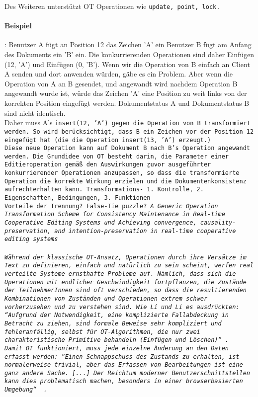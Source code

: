 Des Weiteren unterstützt \gls{OT} Operationen wie \tt{update}, \tt{point}, \tt{lock}.
\paragraph{Beispiel}:
Benutzer A fügt an Position 12 das Zeichen 'A' ein
Benutzer B fügt am Anfang des Dokuments ein 'B' ein.
Die konkurrierenden Operationen sind daher Einfügen (12, 'A') und Einfügen (0, 'B').
Wenn wir die Operation von B einfach an Client A senden und dort anwenden würden, gäbe es ein Problem.
Aber wenn die Operation von A an B gesendet, und angewandt wird nachdem Operation B angewandt wurde ist, würde das Zeichen 'A' eine Position zu weit links von der korrekten Position eingefügt werden.
Dokumentstatus A und Dokumentstatus B sind nicht identisch.\\
Daher muss A's \tt{insert(12, 'A')} gegen die Operation von B transformiert werden. So wird berücksichtigt, dass B ein Zeichen vor der Position 12 eingefügt hat (die die Operation \tt{insert(13, 'A')} erzeugt.)\\
Diese neue Operation kann auf Dokument B nach B's Operation angewandt werden.
Die Grundidee von \gls{OT} besteht darin, die Parameter einer Editieroperation gemäß den Auswirkungen \b{zuvor ausgeführter} konkurrierender Operationen anzupassen, so dass die transformierte Operation die korrekte Wirkung erzielen und die Dokumentenkonsistenz aufrechterhalten kann.
Transformations- 1. Kontrolle, 2. Eigenschaften, Bedingungen, 3. Funktionen\\
Vorteile der Trennung?
False-Tie puzzle? \it{A Generic Operation Transformation Scheme for Consistency Maintenance in Real-time Cooperative Editing Systems} und \it{Achieving convergence, causality-preservation, and intention-preservation in real-time cooperative editing systems}\\\\
Während der klassische OT-Ansatz, Operationen durch ihre Versätze im Text zu definieren, einfach und natürlich zu sein scheint, werfen real verteilte Systeme ernsthafte Probleme auf. Nämlich, dass sich die Operationen mit endlicher Geschwindigkeit fortpflanzen, die Zustände der TeilnehmerInnen sind oft verschieden, so dass die resultierenden Kombinationen von Zuständen und Operationen extrem schwer vorherzusehen und zu verstehen sind.
Wie Li und Li es ausdrückten: ``Aufgrund der Notwendigkeit, eine komplizierte Fallabdeckung in Betracht zu ziehen, sind formale Beweise sehr kompliziert und fehleranfällig, selbst für OT-Algorithmen, die nur zwei charakteristische Primitive behandeln (Einfügen und Löschen)``~\cite{ot-critic}.\\
Damit OT funktioniert, muss jede einzelne Änderung an den Daten erfasst werden: ``Einen Schnappschuss des Zustands zu erhalten, ist normalerweise trivial, aber das Erfassen von Bearbeitungen ist eine ganz andere Sache. [...] Der Reichtum moderner Benutzerschnittstellen kann dies problematisch machen, besonders in einer browserbasierten Umgebung`` ~\cite{diff_sync}.
